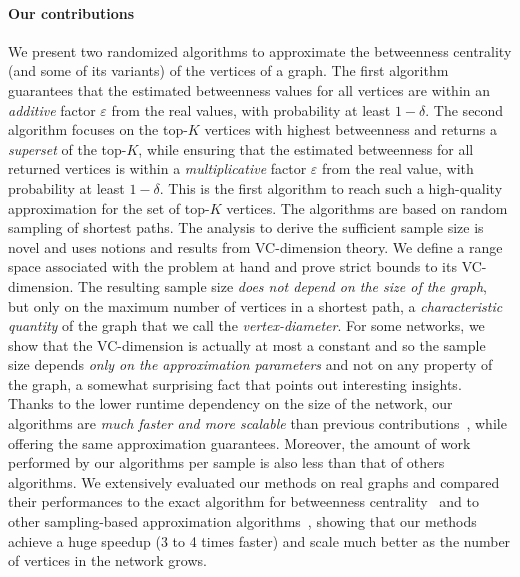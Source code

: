 \paragraph*{Our contributions} 
We present two randomized algorithms to approximate the betweenness centrality
(and some of its variants) of the vertices of a graph. The first algorithm
guarantees that the estimated betweenness values for all vertices are within an
\emph{additive} factor $\varepsilon$ from the real values, with probability at
least $1-\delta$. The second algorithm focuses on the top-$K$ vertices with
highest betweenness and returns a \emph{superset} of the top-$K$,
while ensuring that the estimated betweenness for all returned vertices is
within a \emph{multiplicative} factor $\varepsilon$ from the real value, with
probability at least $1-\delta$. This is the first algorithm to reach such a
high-quality approximation for the set of top-$K$ vertices. The algorithms are
based on random sampling of shortest paths. The analysis to derive the
sufficient sample size is novel and uses notions and results from VC-dimension
theory. We define a range space associated with the problem at hand and prove strict
bounds to its VC-dimension. The resulting sample size \emph{does not
depend on the size of the graph}, but only on the maximum number of vertices
in a shortest path, a \emph{characteristic quantity} of the graph that we call
the \emph{vertex-diameter}. For some networks, we show that the VC-dimension is
actually
at most a constant and so the sample size depends \emph{only on the approximation
parameters} and not on any property of the graph, a somewhat surprising fact
that points out interesting insights. Thanks to the lower runtime dependency on
the size of the network, our algorithms are \emph{much faster and more scalable}
than previous contributions~\citep{JacobKLPT05,BrandesP07,GeisbergerSS08}, while
offering the same approximation guarantees. Moreover, the amount of work
performed by our algorithms per sample is also less than that of others algorithms.
We extensively evaluated our methods on real graphs and compared their
performances to the exact algorithm for betweenness centrality~\citep{Brandes01}
and to other sampling-based approximation
algorithms~\citep{JacobKLPT05,BrandesP07,GeisbergerSS08}, showing that our
methods achieve a huge speedup (3 to 4 times faster) and scale much better as
the number of vertices in the network grows.

